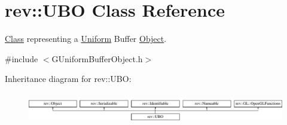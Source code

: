 \hypertarget{classrev_1_1_u_b_o}{}\section{rev\+::U\+BO Class Reference}
\label{classrev_1_1_u_b_o}


\mbox{\hyperlink{struct_class}{Class}} representing a \mbox{\hyperlink{structrev_1_1_uniform}{Uniform}} Buffer \mbox{\hyperlink{classrev_1_1_object}{Object}}.  




{\ttfamily \#include $<$G\+Uniform\+Buffer\+Object.\+h$>$}

Inheritance diagram for rev\+::U\+BO\+:\begin{figure}[H]
\begin{center}
\leavevmode
\includegraphics[height=1.325444cm]{classrev_1_1_u_b_o}
\end{center}
\end{figure}
